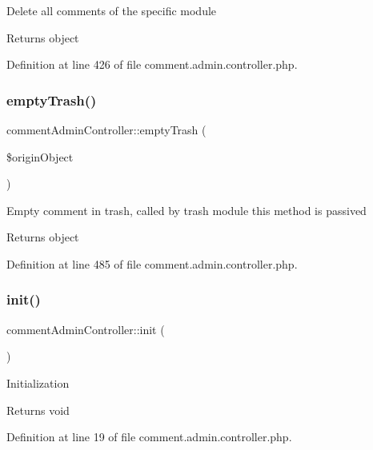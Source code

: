 Delete all comments of the specific module \begin{DoxyReturn}{Returns}
object 
\end{DoxyReturn}


Definition at line 426 of file comment.\+admin.\+controller.\+php.

\hypertarget{classcommentAdminController_a2b58a744dab20359d036052d505dbb49}{}\label{classcommentAdminController_a2b58a744dab20359d036052d505dbb49} 
\subsubsection{\texorpdfstring{empty\+Trash()}{emptyTrash()}}
{\footnotesize\ttfamily comment\+Admin\+Controller\+::empty\+Trash (\begin{DoxyParamCaption}\item[{}]{\$origin\+Object }\end{DoxyParamCaption})}

Empty comment in trash, called by trash module this method is passived \begin{DoxyReturn}{Returns}
object 
\end{DoxyReturn}


Definition at line 485 of file comment.\+admin.\+controller.\+php.

\hypertarget{classcommentAdminController_abf17eb18137aa56c78b455fdd2b71b1f}{}\label{classcommentAdminController_abf17eb18137aa56c78b455fdd2b71b1f} 
\subsubsection{\texorpdfstring{init()}{init()}}
{\footnotesize\ttfamily comment\+Admin\+Controller\+::init (\begin{DoxyParamCaption}{ }\end{DoxyParamCaption})}

Initialization \begin{DoxyReturn}{Returns}
void 
\end{DoxyReturn}


Definition at line 19 of file comment.\+admin.\+controller.\+php.

\hypertarget{classcommentAdminController_adea631f91fd944326a1363dbff258d2f}{}\label{classcommentAdminController_adea631f91fd944326a1363dbff258d2f} 
